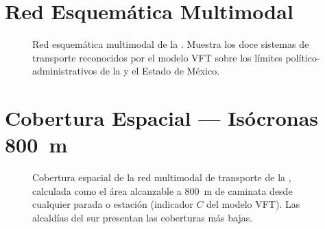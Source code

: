 \section{Red Esquemática Multimodal}
\label{anx:mapa-red-esquematica}

\begin{figure}[p]
  \centering
  \caption[Red esquemática multimodal de la ZMVM (alta resolución)]{Red esquemática multimodal de la \zmvm{}.
    Muestra los doce sistemas de transporte reconocidos por el modelo VFT sobre los límites político-administrativos
    de la \cdmx{} y el Estado de México.\DIFdelbeginFL %
\DIFdelendFL }
  \label{fig:anx-mapa-red}
  \DIFaddbeginFL {}
\DIFaddendFL \end{figure}

\section{Cobertura Espacial — Isócronas 800~m}
\label{anx:mapa-cobertura-total}

\begin{figure}[p]
  \centering
  \caption[Cobertura de la red por isócronas de 800~m (alta resolución)]{Cobertura espacial de la red multimodal de transporte
    de la \zmvm{}, calculada como el área alcanzable a 800~m de caminata desde cualquier parada o estación
    (indicador $C$ del modelo VFT). Las alcaldías del sur presentan las coberturas más bajas.\DIFdelbeginFL %
\DIFdelendFL }
  \label{fig:anx-mapa-cobertura-total}
  \DIFaddbeginFL {}
\DIFaddendFL \end{figure}


